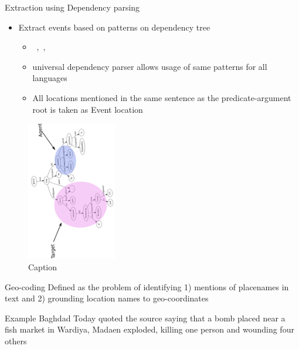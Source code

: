 \begin{frame}{Extraction using Dependency parsing}
\begin{itemize}
\small
    \item Extract events based on patterns on dependency tree
    \begin{itemize}
    \small
        \item ~\cite{predpatt},~\cite{pp-paper1},~\cite{reddy2017universal}
        \item universal dependency parser allows usage of same patterns for all languages
        \item All locations mentioned in the same sentence as the predicate-argument root is taken as Event location
    \end{itemize}    
\end{itemize}
\vspace{-1em}
\begin{figure}
    \centering
    \includegraphics[width=0.35\textwidth, angle=-92]{Problem2/figures/depTree.png}
    \caption{Caption}
    \label{fig:my_label}
\end{figure}
\end{frame}

\begin{frame}{Geo-coding}
    Defined as the problem of identifying 1) mentions of placenames  in text and 2) grounding location names to geo-coordinates \\
    
    \begin{block}{Example}
    \alert{Baghdad Today} quoted the source saying that a bomb placed near a fish market in \alert{Wardiya, Madaen} exploded, killing one person and wounding four others
    \end{block}
\end{frame}

